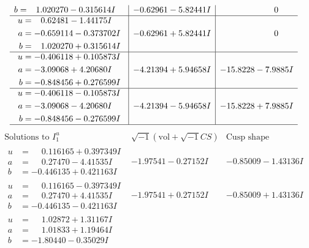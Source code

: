\documentclass[1p]{elsarticle_modified}
\theoremstyle{definition}
\newcommand{\I}{\sqrt{-1}}
\begin{document}
$$\begin{array}{c|c|c}
\begin{aligned}
b &= \phantom{-}1.020270 - 0.315614 I\end{aligned}
 & -0.62961 - 5.82441 I & \phantom{-0.000000 } 0 \\ \hline\begin{aligned}
u &= \phantom{-}0.62481 - 1.44175 I \\
a &= -0.659114 - 0.373702 I \\
b &= \phantom{-}1.020270 + 0.315614 I\end{aligned}
 & -0.62961 + 5.82441 I & \phantom{-0.000000 } 0 \\ \hline\begin{aligned}
u &= -0.406118 + 0.105873 I \\
a &= -3.09068 + 4.20680 I \\
b &= -0.848456 + 0.276599 I\end{aligned}
 & -4.21394 + 5.94658 I & -15.8228 - 7.9885 I \\ \hline\begin{aligned}
u &= -0.406118 - 0.105873 I \\
a &= -3.09068 - 4.20680 I \\
b &= -0.848456 - 0.276599 I\end{aligned}
 & -4.21394 - 5.94658 I & -15.8228 + 7.9885 I\\
 \hline 
 \end{array}$$\newpage$$\begin{array}{c|c|c}  
\text{Solutions to }I^u_{1}& \I (\text{vol} + \sqrt{-1}CS) & \text{Cusp shape}\\
 \hline 
\begin{aligned}
u &= \phantom{-}0.116165 + 0.397349 I \\
a &= \phantom{-}0.27470 - 4.41535 I \\
b &= -0.446135 + 0.421163 I\end{aligned}
 & -1.97541 - 0.27152 I & -0.85009 - 1.43136 I \\ \hline\begin{aligned}
u &= \phantom{-}0.116165 - 0.397349 I \\
a &= \phantom{-}0.27470 + 4.41535 I \\
b &= -0.446135 - 0.421163 I\end{aligned}
 & -1.97541 + 0.27152 I & -0.85009 + 1.43136 I \\ \hline\begin{aligned}
u &= \phantom{-}1.02872 + 1.31167 I \\
a &= \phantom{-}1.01833 + 1.19464 I \\
b &= -1.80440 - 0.35029 I\end{aligned}

\end{array}$$
\end{document}
